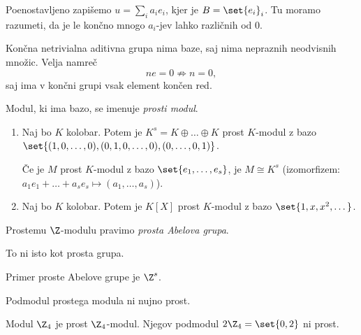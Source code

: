 Poenostavljeno zapišemo $u = \sum_i a_i e_i$, kjer je $B = \set{e_i}_i$. Tu moramo razumeti, 
da je le končno mnogo $a_i$-jev lahko različnih od $0$.

\begin{primer}
    Končna netrivialna aditivna grupa nima baze, saj nima nepraznih neodvisnih množic. Velja namreč
    \[
        ne = 0 \not\Rightarrow n = 0, 
    \]
    saj ima v končni grupi vsak element končen red.
\end{primer}

\begin{definicija}
    Modul, ki ima bazo, se imenuje \emph{prosti modul}.
\end{definicija}

\begin{primer}
    \begin{enumerate}
        \item Naj bo $K$ kolobar. Potem je $K^s = K \oplus \dots \oplus K$ prost $K$-modul 
        z bazo $\set{(1,0,\dots,0), (0, 1, 0, \dots, 0), (0,\dots,0,1)}$. 

        Če je $M$ prost $K$-modul z bazo $\set{e_1, \dots, e_s}$, je $M \cong K^s$ 
        (izomorfizem: $a_1e_1 + \dots + a_se_s \mapsto (a_1, \dots, a_s)$).

        \item Naj bo $K$ kolobar. Potem je $K[X]$ prost $K$-modul z bazo $\set{1, x, x^2, \dots}$.
    \end{enumerate}
\end{primer}

\begin{definicija}
    Prostemu $\Z$-modulu pravimo \emph{prosta Abelova grupa}.
\end{definicija}

\begin{opomba}
    To ni isto kot prosta grupa.
\end{opomba}

\begin{primer}
    Primer proste Abelove grupe je $\Z^s$.
\end{primer}

\begin{opomba}
    Podmodul prostega modula ni nujno prost.
\end{opomba}

\begin{primer}
    Modul $\Z_4$ je prost $\Z_4$-modul. Njegov podmodul $2\Z_4 = \set{0, 2}$ ni prost.
\end{primer}

